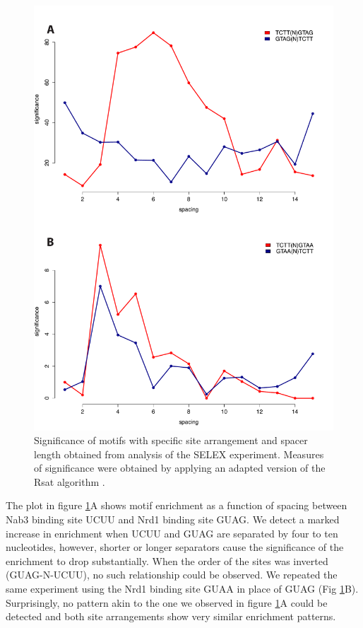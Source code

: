 \begin{figure}[hp!]

\centering
\includegraphics[width=\textwidth]{figures/results/positionalVitro}
\caption[Enrichment of Nrd1 and Nab3 sites with different arrangements and spacings in the SELEX experiment]{Significance of motifs with specific site arrangement and spacer length obtained from analysis of the SELEX experiment. Measures of significance were obtained by applying an adapted version of the Rsat algorithm \cite[see methods]{vanhelden:1998:extracting}.}
\label{fig:positionalVitro}

\end{figure} 

The plot in figure \ref{fig:positionalVitro}A shows motif enrichment as a function of spacing between Nab3 binding site UCUU and Nrd1 binding site GUAG.  We detect a marked increase in enrichment when UCUU and GUAG are separated by four to ten nucleotides, however, shorter or longer separators cause the significance of the enrichment to drop substantially. When the order of the sites was inverted (GUAG-N-UCUU), no such relationship could be observed. We repeated the same experiment using the Nrd1 binding site GUAA in place of GUAG (Fig \ref{fig:positionalVitro}B). Surprisingly, no pattern akin to the one we observed in figure \ref{fig:positionalVitro}A could be detected and both site arrangements show very similar enrichment patterns.

